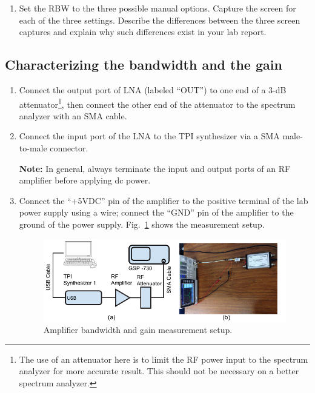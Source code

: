 \documentclass[letterpaper, 11pt]{article}
\begin{document}
\begin{enumerate}
\begin{enumerate}
			\item Set the RBW to the three possible manual options. Capture the screen for each of the three settings. Describe the differences between the three screen captures and explain why such differences exist in your lab report.
			
		\end{enumerate}
\end{enumerate}


\subsection{Characterizing the bandwidth and the gain}
\label{sec:bw-gain}

\begin{enumerate}
	\item Connect the output port of LNA (labeled ``OUT'') to one end of a 3-dB attenuator\footnote{The use of an attenuator here is to limit the RF power input to the spectrum analyzer for more accurate result. This should not be necessary on a better spectrum analyzer.}, then connect the other end of the attenuator to the spectrum analyzer with an SMA cable. 
	
	\item Connect the input port of the LNA to the TPI synthesizer via a SMA male-to-male connector. 
	
	\textbf{Note:} In general, always terminate the input and output ports of an RF amplifier before applying dc power. 
	
	\item Connect the ``+5VDC'' pin of the amplifier to the positive terminal of the lab power supply using a wire; connect the ``GND'' pin of the amplifier to the ground of the power supply. Fig.~\ref{fig:setup-bw-gain} shows the measurement setup. 
	
		\begin{figure}[h]
			\centering
			\includegraphics[width=5in]{setup-bw-gain}
			\caption{Amplifier bandwidth and gain measurement setup.}
			\label{fig:setup-bw-gain}
		\end{figure}	
	

\end{enumerate}
\end{document}
